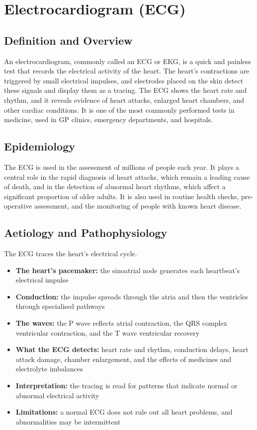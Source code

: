 \chapter{Electrocardiogram (ECG)}

\section*{Definition and Overview}
An electrocardiogram, commonly called an ECG or EKG, is a quick and painless test that records the electrical activity of the heart. The heart's contractions are triggered by small electrical impulses, and electrodes placed on the skin detect these signals and display them as a tracing. The ECG shows the heart rate and rhythm, and it reveals evidence of heart attacks, enlarged heart chambers, and other cardiac conditions. It is one of the most commonly performed tests in medicine, used in GP clinics, emergency departments, and hospitals.

\section*{Epidemiology}
The ECG is used in the assessment of millions of people each year. It plays a central role in the rapid diagnosis of heart attacks, which remain a leading cause of death, and in the detection of abnormal heart rhythms, which affect a significant proportion of older adults. It is also used in routine health checks, pre-operative assessment, and the monitoring of people with known heart disease.

\section*{Aetiology and Pathophysiology}
The ECG traces the heart's electrical cycle.
\begin{itemize}
    \item \textbf{The heart's pacemaker:} the sinoatrial node generates each heartbeat's electrical impulse
    \item \textbf{Conduction:} the impulse spreads through the atria and then the ventricles through specialised pathways
    \item \textbf{The waves:} the P wave reflects atrial contraction, the QRS complex ventricular contraction, and the T wave ventricular recovery
    \item \textbf{What the ECG detects:} heart rate and rhythm, conduction delays, heart attack damage, chamber enlargement, and the effects of medicines and electrolyte imbalances
    \item \textbf{Interpretation:} the tracing is read for patterns that indicate normal or abnormal electrical activity
    \item \textbf{Limitations:} a normal ECG does not rule out all heart problems, and abnormalities may be intermittent
\end{itemize}


